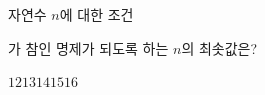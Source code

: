 자연수 $n$에 대한 조건 \par\smallskip{}\par\smallskip\noindent 가 참인 명제가 되도록 하는 $n$의 최솟값은?
\begin{choices32}{$12$}{$13$}{$14$}{$15$}{$16$}\end{choices32}
